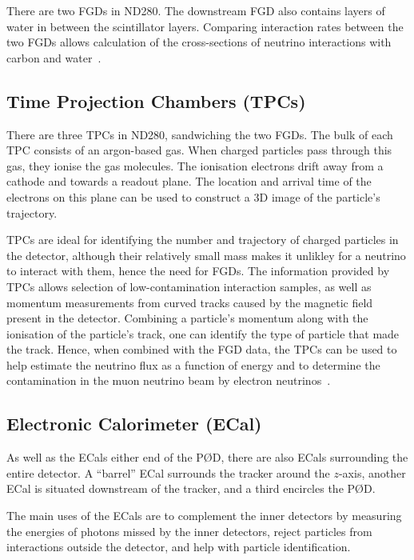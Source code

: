 \documentclass[aps,pra,12pt,notitlepage,tightenlines]{revtex4-1}
\begin{document}
There are two FGDs in ND280. The downstream FGD also contains layers of water in between the scintillator layers. Comparing interaction rates between the two FGDs allows calculation of the cross-sections of neutrino interactions with carbon and water~\cite{ABE2011106, Amaudruz:2012agx}.

\subsection{Time Projection Chambers (TPCs)}
There are three TPCs in ND280, sandwiching the two FGDs. The bulk of each TPC consists of an argon-based gas. When charged particles pass through this gas, they ionise the gas molecules. The ionisation electrons drift away from a cathode and towards a readout plane. The location and arrival time of the electrons on this plane can be used to construct a 3D image of the particle's trajectory.

TPCs are ideal for identifying the number and trajectory of charged particles in the detector, although their relatively small mass makes it unlikley for a neutrino to interact with them, hence the need for FGDs. The information provided by TPCs allows selection of low-contamination interaction samples, as well as momentum measurements from curved tracks caused by the magnetic field present in the detector. Combining a particle's momentum along with the ionisation of the particle's track, one can identify the type of particle that made the track. Hence, when combined with the FGD data, the TPCs can be used to help estimate the neutrino flux as a function of energy and to determine the contamination in the muon neutrino beam by electron neutrinos~\cite{ABE2011106, Abgrall:2010hi}.

\subsection{Electronic Calorimeter (ECal)}
As well as the ECals either end of the P\O D, there are also ECals surrounding the entire detector. A ``barrel'' ECal surrounds the tracker around the $z$-axis, another ECal is situated downstream of the tracker, and a third encircles the P\O D. %

The main uses of the ECals are to complement the inner detectors by measuring the energies of photons missed by the inner detectors, reject particles from interactions outside the detector, and help with particle identification.
\end{document}
